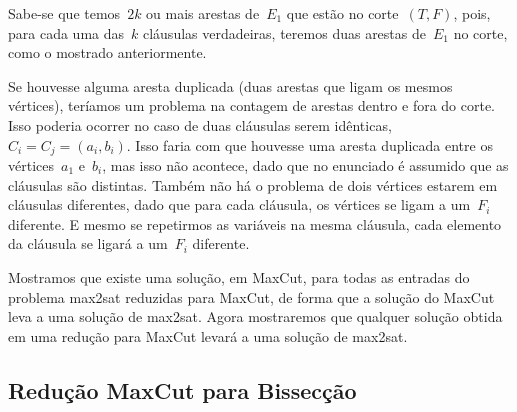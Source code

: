 		Sabe-se que temos~$2k$ ou mais arestas de~$E_1$ que estão no
		corte~$(T,F)$, pois, para cada uma das~$k$ cláusulas
		verdadeiras, teremos duas arestas de~$E_1$ no corte, como
		o mostrado anteriormente.

		Se houvesse alguma aresta duplicada (duas arestas que ligam
		os mesmos vértices), teríamos um problema na contagem de
		arestas dentro e fora do corte.
		Isso poderia ocorrer no caso de duas cláusulas serem 
		idênticas,~${C_i=C_j=(a_i,b_i)}$.
		Isso faria com que houvesse uma aresta duplicada entre
		os vértices~$a_1$ e~$b_i$, mas isso não acontece, dado que
		no enunciado é assumido que as cláusulas são distintas.
		Também não há o problema de dois vértices estarem em cláusulas
		diferentes, dado que para cada cláusula, os vértices se ligam
		a um~$F_i$ diferente.
		E mesmo se repetirmos as variáveis na mesma cláusula, cada
		elemento da cláusula se ligará a um~$F_i$ diferente.

		\bigskip

		Mostramos que existe uma solução, em MaxCut, 
		para todas as entradas do
		problema {\sc max2sat} reduzidas para MaxCut, de forma que
		a solução do MaxCut leva a uma solução de {\sc max2sat}.
		Agora mostraremos que qualquer solução obtida em 
		uma redução para MaxCut levará a uma solução de {\sc max2sat}.


\subsection{Redução MaxCut para Bissecção}




	


